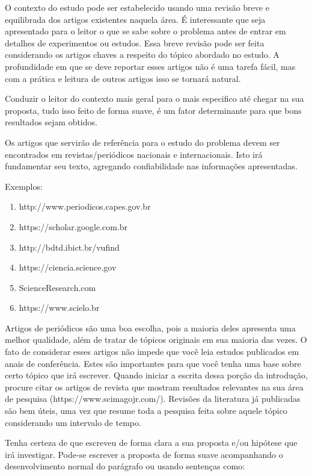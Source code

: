     O contexto do estudo pode ser estabelecido usando uma revisão breve e equilibrada dos artigos existentes naquela área. É interessante que seja apresentado para o leitor o que se sabe sobre o problema antes de entrar em detalhes de experimentos ou estudos. Essa breve revisão pode ser feita considerando os artigos chaves a respeito do tópico abordado no estudo. A profundidade em que se deve reportar esses artigos não é uma tarefa fácil, mas com a prática e leitura de outros artigos isso se tornará natural. 
    
    Conduzir o leitor do contexto mais geral para o mais especifico até chegar na sua proposta, tudo isso feito de forma suave, é um fator determinante para que bons resultados sejam obtidos.
    
    Os artigos que servirão de referência para o estudo do problema devem ser encontrados em revistas/periódicos nacionais e internacionais. Isto irá fundamentar seu texto, agregando confiabilidade nas informações apresentadas.
    
    Exemplos:
    \begin{enumerate}
        \item http://www.periodicos.capes.gov.br
        \item https://scholar.google.com.br
        \item http://bdtd.ibict.br/vufind
        \item https://ciencia.science.gov
        \item ScienceResearch.com
        \item https://www.scielo.br
    \end{enumerate}
    
    Artigos de periódicos são uma boa escolha, pois a maioria deles apresenta uma melhor qualidade, além de tratar de tópicos originais em sua maioria das vezes. O fato de considerar esses artigos não impede que você leia estudos publicados em anais de conferência. Estes são importantes para que você tenha uma base sobre certo tópico que irá escrever. Quando iniciar a escrita dessa porção da introdução, procure citar os artigos de revista que mostram resultados relevantes na sua área de pesquisa (https://www.scimagojr.com/). Revisões da literatura já publicadas são bem úteis, uma vez que resume toda a pesquisa feita sobre aquele tópico considerando um intervalo de tempo.
    
    Tenha certeza de que escreveu de forma clara a sua proposta e/ou hipótese que irá investigar. Pode-se escrever a proposta de forma suave acompanhando o desenvolvimento normal do parágrafo ou usando sentenças como:

